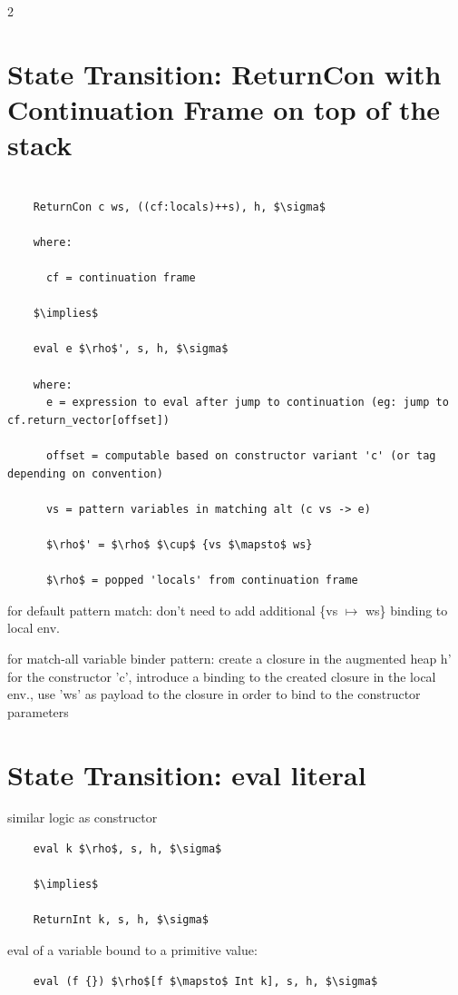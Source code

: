 \documentclass[8pt]{extarticle}
\begin{document}
\begin{multicols*}{2}
  \section{State Transition: ReturnCon with Continuation Frame on top of the stack}

  \begin{lstlisting}

    ReturnCon c ws, ((cf:locals)++s), h, $\sigma$

    where:

      cf = continuation frame

    $\implies$

    eval e $\rho$', s, h, $\sigma$

    where:
      e = expression to eval after jump to continuation (eg: jump to cf.return_vector[offset])

      offset = computable based on constructor variant 'c' (or tag depending on convention)

      vs = pattern variables in matching alt (c vs -> e)

      $\rho$' = $\rho$ $\cup$ {vs $\mapsto$ ws}

      $\rho$ = popped 'locals' from continuation frame
    \end{lstlisting}

    for default pattern match: don't need to add additional \{vs $\mapsto$ ws\} binding to local env.
    
    for match-all variable binder pattern: create a closure in the augmented heap h' for the constructor 'c', introduce a binding to the created closure in the local env., use 'ws' as payload to the closure in order to bind to the constructor parameters

  \section{State Transition: eval literal}

  similar logic as constructor

  \begin{lstlisting}
    eval k $\rho$, s, h, $\sigma$

    $\implies$

    ReturnInt k, s, h, $\sigma$
  \end{lstlisting}

  eval of a variable bound to a primitive value:
  
  \begin{lstlisting}
    eval (f {}) $\rho$[f $\mapsto$ Int k], s, h, $\sigma$


\end{lstlisting}
\end{multicols*}
\end{document}

